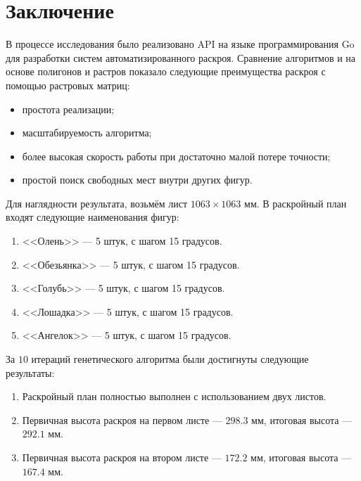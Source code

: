 \documentclass[14pt]{extarticle}
\begin{document}
	\section{Заключение}
	В процессе исследования было реализовано API на языке программирования Go для разработки систем автоматизированного раскроя. Сравнение алгоритмов и на основе полигонов и растров показало следующие преимущества раскроя с помощью растровых матриц:
	\begin{itemize}
		\item простота реализации;
		\item масштабируемость алгоритма;
		\item более высокая скорость работы при достаточно малой потере точности;
		\item простой поиск свободных мест внутри других фигур.		
	\end{itemize}

	Для наглядности результата, возьмём лист $1063\times1063$ мм. В раскройный план входят следующие наименования фигур:
	\begin{enumerate}
		\item <<Олень>> --- 5 штук, с шагом 15 градусов.
		\item <<Обезьянка>> --- 5 штук, с шагом 15 градусов.
		\item <<Голубь>> --- 5 штук, с шагом 15 градусов.
		\item <<Лошадка>> --- 5 штук, с шагом 15 градусов.
		\item <<Ангелок>> --- 5 штук, с шагом 15 градусов.
	\end{enumerate}


	За $10$ итераций генетического алгоритма были достигнуты следующие результаты:
	\begin{enumerate}
		\item Раскройный план полностью выполнен с использованием двух листов.
		\item Первичная высота раскроя на первом листе --- $298.3$ мм, итоговая высота --- $292.1$ мм.
		\item Первичная высота раскроя на втором листе --- $172.2$ мм, итоговая высота --- $167.4$ мм.
	\end{enumerate}
\end{document}
